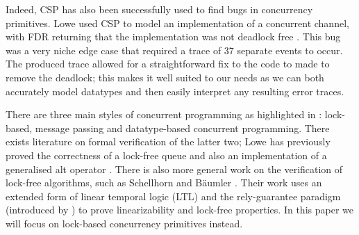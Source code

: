 Indeed, CSP has also been successfully used to find bugs in concurrency primitives. Lowe used CSP to model an implementation of a concurrent channel, with FDR returning that the implementation was not deadlock free \cite{LoweDeadlock}. This bug was a very niche edge case that required a trace of 37 separate events to occur. The produced trace allowed for a straightforward fix to the code to made to remove the deadlock; this makes it well suited to our needs as we can both accurately model datatypes and then easily interpret any resulting error traces.

There are three main styles of concurrent programming as highlighted in \cite{CADS}: lock-based, message passing and datatype-based concurrent programming. There exists literature on formal verification of the latter two; Lowe has previously proved the correctness of a lock-free queue \cite{LFQueue} and also an implementation of a generalised alt operator \cite{LoweAlt}. There is also more general work on the verification of lock-free algorithms, such as Schellhorn and B{\"a}umler \cite{Schellhorn}. Their work uses an extended form of linear temporal logic (LTL) and the rely-guarantee paradigm (introduced by \cite{Jones}) to prove linearizability and lock-free properties. 
In this paper we will focus on lock-based concurrency primitives instead. %





